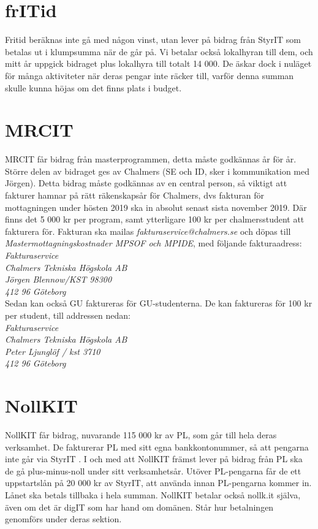 \documentclass{article}
\newcommand\tab[1][1cm]{\hspace*{#1}}
\newcommand{\fritid}{frITid }
\newcommand{\nollkit}{NollKIT }
\newcommand{\mrcit}{MRCIT }
\newcommand{\digit}{digIT }
\newcommand{\styrit}{StyrIT }
\begin{document}
\section{\fritid}
Fritid beräknas inte gå med någon vinst, utan lever på bidrag från \styrit som betalas ut i klumpsumma när de går på. Vi betalar också lokalhyran till dem, och mitt år uppgick bidraget plus lokalhyra till totalt 14 000. De äskar dock i nuläget för många aktiviteter när deras pengar inte räcker till, varför denna summan skulle kunna höjas om det finns plats i budget. 

\section{\mrcit}
\mrcit får bidrag från masterprogrammen, detta måste godkännas år för år. Större delen av bidraget ges av Chalmers (SE och ID, sker i kommunikation med Jörgen). Detta bidrag måste godkännas av en central person, så viktigt att fakturer hamnar på rätt räkenskapsår för Chalmers, dvs fakturan för mottagningen under hösten 2019 ska in absolut senast sista november 2019. Där finns det 5 000 kr per program, samt ytterligare 100 kr per chalmersstudent att fakturera för. Fakturan ska mailas \textit{fakturaservice@chalmers.se}  och döpas till  \textit{Mastermottagningskostnader MPSOF och MPIDE}, med följande fakturaadress: \\

\textit{
\tab[0.3cm] Fakturaservice\\
\tab Chalmers Tekniska Högskola AB\\
\tab Jörgen Blennow/KST 98300  \\
\tab 412 96 Göteborg} \\

Sedan kan också GU faktureras för GU-studenterna. De kan faktureras för 100 kr per student, till addressen nedan:  \\

\textit{
\tab[0.3cm] Fakturaservice\\
\tab Chalmers Tekniska Högskola AB\\
\tab Peter Ljunglöf / kst 3710 \\
\tab 412 96 Göteborg}

\section{\nollkit}
\nollkit får bidrag, nuvarande 115 000 kr av PL, som går till hela deras verksamhet. De fakturerar PL med sitt egna bankkontonummer, så att pengarna inte går via \styrit. I och med att NollKIT främst lever på bidrag från PL ska de gå plus-minus-noll under sitt verksamhetsår. Utöver PL-pengarna får de ett uppstartslån på 20 000 kr av StyrIT, att använda innan PL-pengarna kommer in. Lånet ska betals tillbaka i hela summan. \nollkit betalar också nollk.it själva, även om det är \digit som har hand om domänen. Står hur betalningen genomförs under deras sektion. 
\end{document}
